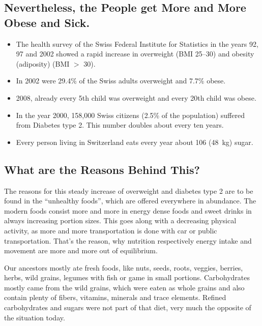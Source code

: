 \documentclass[../main.tex]{subfiles}
\begin{document}
  \subsection[Nevertheless, the People get More Obese and Sick]{Nevertheless, the People get More and More Obese and Sick.}

  \begin{itemize}
  \item The health survey of the Swiss Federal Institute for Statistics in the years 92, 97 and 2002
    showed a rapid increase in overweight (BMI 25--30) and obesity (adiposity) (BMI $>$ 30).
  \item In 2002 were 29.4\% of the Swiss adults overweight and 7.7\% obese.
  \item 2008, already every 5th child was overweight and every 20th child was obese.
  \item In the year 2000, 158,000 Swiss citizens (2.5\% of the population) suffered from Diabetes type 2. This number doubles about every ten years.
  \item Every person living in Switzerland eats every year about \SI{106}{\lbs} (\SI{48}{\kilo\gram}) sugar.
  \end{itemize}

\subsection{What are the Reasons Behind This?}  

The reasons for this steady increase of overweight
and diabetes type 2
  are to be found in the ``unhealthy foods'',
which are offered everywhere in abundance.
The modern foods consist more and more in energy dense foods and sweet drinks in always increasing portion sizes.
This goes along with a decreasing physical activity, as more and more transportation is done with car or public transportation.
That's the reason, why nutrition respectively energy intake and movement are more and more out of equilibrium.

Our ancestors mostly ate fresh foods, like nuts, seeds, roots, veggies, berries, herbs, wild grains,
legumes with fish or game in small portions.
Carbohydrates mostly came from the wild grains, which were eaten as whole grains and also contain plenty
of fibers, vitamins, minerals and trace elements.
Refined carbohydrates and sugars were not part of that diet, very much the opposite of the situation today.
\end{document}
